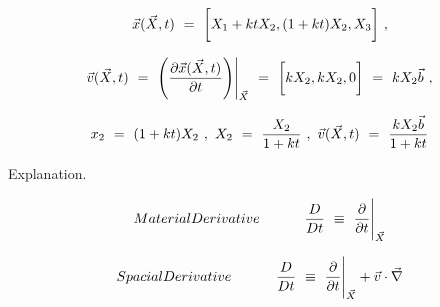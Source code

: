 \documentclass{article}
\newcounter{subsubsubsection}[subsubsection]
\begin{document}
\begin{equation} \label{eq:1}
\vec{x}( \vec{X} , t ) \hspace{0.125cm} = \hspace{0.125cm} \bigg[ X_1 + k t X_2 , ( 1 + kt ) X_2 , X_3 \bigg] \hspace{0.125cm} , 
\end{equation}

\begin{equation} \label{eq:1}
\vec{v}( \vec{X} , t ) \hspace{0.125cm} = \hspace{0.125cm} \Bigg( \frac{ \partial{\vec{x}( \vec{X} , t )}}{\partial{t}} \Bigg) \Bigg|_{\vec{X}} \hspace{0.125cm} = \hspace{0.125cm} \bigg[ k X_2 , k X_2 , 0 \bigg] \hspace{0.125cm} = \hspace{0.125cm} k X_2 \vec{b} \hspace{0.125cm} , 
\end{equation}

\begin{equation} \label{eq:1}
x_2 \hspace{0.125cm} = \hspace{0.125cm}  ( 1 + kt ) X_2 \hspace{0.125cm} , \hspace{0.125cm} X_2 \hspace{0.125cm} = \hspace{0.125cm} \frac{X_2}{1 + kt} \hspace{0.125cm} , \hspace{0.125cm} \vec{v}( \vec{X} , t ) \hspace{0.125cm} = \hspace{0.125cm} \frac{k X_2 \vec{b}}{1 + kt}
\end{equation}


Explanation.

\begin{equation} \label{eq:1}
Material Derivative \hspace{1.125cm} \frac{D}{Dt} \hspace{0.125cm} \equiv \hspace{0.125cm} \frac{\partial}{\partial{t}} \Bigg|_{\vec{X}} 
\end{equation}

\begin{equation} \label{eq:1}
Spacial Derivative \hspace{1.125cm} \frac{D}{Dt} \hspace{0.125cm} \equiv \hspace{0.125cm} \frac{\partial}{\partial{t}} \Bigg|_{\vec{X}} + \vec{v}\cdot\vec{\nabla}
\end{equation}
\end{document}
